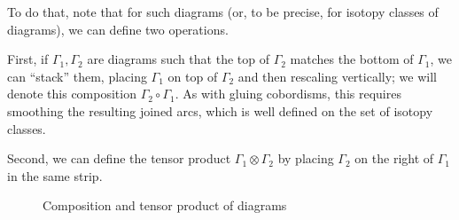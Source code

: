 To do that, note that for such diagrams (or, to be precise, for isotopy classes
of diagrams), we can define two operations.

First, if $\Gamma_1, \Gamma_2$ are diagrams such that the top of $\Gamma_2$
matches the bottom of $\Gamma_1$, we can ``stack'' them, placing $\Gamma_1$ on
top of $\Gamma_2$ and then rescaling vertically; we will denote this
composition $\Gamma_2\circ\Gamma_1$. As with gluing cobordisms, this requires
smoothing the resulting joined arcs, which is well defined on the set of isotopy
classes.

Second, we can define the tensor product $\Gamma_1\otimes \Gamma_2$ by placing
$\Gamma_2$ on the right of $\Gamma_1$ in the same strip.

\begin{figure}[ht]

\qquad\qquad

\caption{Composition and tensor product of diagrams}
\end{figure}





